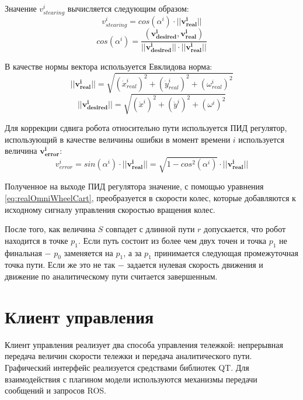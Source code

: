 \documentclass[oneside,final,14pt]{extreport}
\newcommand{\bs}{\boldsymbol}
\begin{document}
  Значение $v_{stearing}^i$ вычисляется следующим образом:  
\begin{equation}
v_{stearing}^i
=
cos(\alpha^i)
\cdot
||\bs{v_{real}^i}||
\end{equation}
\begin{equation}
cos(\alpha^i)
=
\frac{
(\bs{v_{desired}^i},\bs{v_{real}^i})
}
{
||\bs{v_{desired}^i}||
\cdot
||\bs{v_{real}^i}||
}
\end{equation}

В качестве нормы вектора используется Евклидова норма:
\begin{equation}
||\bs{v_{real}^i}||
=
\sqrt{ 
	(\dot{x}_{real}^i)^2 
	+ 
	(\dot{y}_{real}^i)^2
	+
	(\omega_{real}^i)^2
	}	
\end{equation}
\begin{equation}
||\bs{v_{desired}^i}||
=
\sqrt{ 
	(\dot{x}^i)^2 
	+ 
	(\dot{y}^i)^2
	+
	(\omega^i)^2
	}	
\end{equation}

Для коррекции сдвига  робота относительно пути используется ПИД регулятор, использующий в качестве величины ошибки в момент времени $i$ используется величина $\bs{v_{error}^i}$:
\begin{equation}
v_{error}^i
=
sin(\alpha^i)
\cdot
||\bs{v_{real}^i}||
=
\sqrt{1-cos^2(\alpha^i)}
\cdot
||\bs{v_{real}^i}||
\end{equation}

Полученное на выходе ПИД регулятора значение, с помощью уравнения \ref{eq:realOmniWheelCart}, преобразуется в скорости колес, которые добавляются к исходному сигналу управления скоростью вращения колес. 

После того, как величина $S$ совпадет с длинной пути $r$ допускается, что робот находится в точке $p_1$.  Если путь состоит из более чем двух точен и точка $p_1$ не финальная $-$ $p_0$ заменяется на $p_1$, а за  $p_1$ принимается следующая промежуточная точка пути. Если же это не так $-$ задается нулевая скорость движения и движение по аналитическому пути считается завершенным.

\section{ Клиент управления } 

Клиент управления реализует два способа управления тележкой: непрерывная передача величин скорости тележки и передача аналитического пути. Графический интерфейс реализуется средствами библиотек QT. Для взаимодействия с плагином модели используются механизмы передачи сообщений и запросов ROS.
\end{document}
